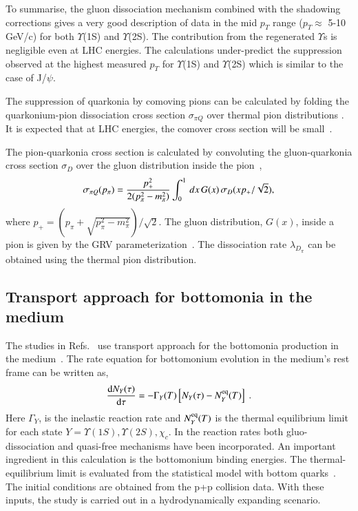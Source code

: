 {To summarise, the gluon dissociation mechanism combined with the shadowing
corrections gives a very good description of data in the mid $p_{T}$ range ($p_{T}\approx$ 5-10 GeV/c)
for both $\Upsilon$(1S) and $\Upsilon$(2S).
The contribution from the regenerated $\Upsilon$s is negligible even at LHC energies.
The calculations under-predict the suppression observed at the highest measured
$p_{T}$ for $\Upsilon$(1S) and $\Upsilon$(2S) which is similar to the case
of J/$\psi$.

The suppression of quarkonia by comoving pions can be calculated by folding the quarkonium-pion
dissociation cross section $\sigma_{\pi Q}$ over thermal pion distributions \cite{Vogt:1988fj}. 
It is expected  that at LHC energies, the comover cross section will be small~\cite{Lourenco:2008sk}.
{\color{black}
The pion-quarkonia cross section is calculated by convoluting the gluon-quarkonia cross section $\sigma_D$
over the gluon distribution inside the pion~\cite{Arleo:2001mp},
\begin{equation}
\sigma_{\pi Q} (p_{\pi}) = {p_+^2 \over 2(p_\pi^2 - m_\pi^2)} \int_0^1 \, dx \, G(x) \, \sigma_D(xp_+/\sqrt {2}),
\end{equation}
where $p_+ = (p_\pi + \sqrt{p_\pi^2-m_\pi^2})/\sqrt{2}$. The gluon distribution, $G(x)$, inside a pion is 
given by the GRV parameterization~\cite{Gluck:1991ey}. 
The dissociation rate $\lambda_{D_{\pi}}$  can be obtained using the 
thermal pion distribution.



\subsection{Transport approach for bottomonia in the medium}
 The studies in Refs.~\cite{Grandchamp:2005yw,Rapp:2017chc} use 
transport approach for the bottomonia production in the medium~\cite{Grandchamp:2005yw,Rapp:2017chc}.
The rate equation for bottomonium evolution in the medium's rest frame
can be written as,
\begin{equation}
\frac{\mathrm{d} N_Y(\tau)}{\mathrm{d}\tau} =
-\Gamma_Y(T)\left[N_Y(\tau)-N^{\rm eq}_Y(T)\right] \ .
\end{equation}
Here $\Gamma_Y$, is the inelastic reaction rate  and $N^{\rm eq}_Y(T)$ is the thermal
equilibrium limit  for each state $Y=\Upsilon(1S), \Upsilon(2S), \chi_c$.
In the reaction rates  both gluo-dissociation and quasi-free mechanisms have
been incorporated.  An important ingredient in this calculation is the bottomonium
binding energies. The thermal-equilibrium limit is evaluated from the statistical
model with bottom quarks~\cite{Grandchamp:2002wp}. 
The initial conditions are obtained from the p+p collision data. With these inputs,
the study is carried out in a hydrodynamically expanding scenario.  


}}
